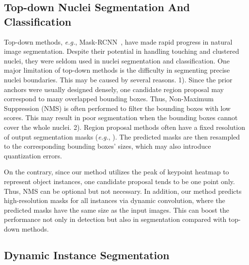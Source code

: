 \documentclass[lettersize,journal]{IEEEtran}
\newcommand{\eg}{{\textit{e.g.}}, }
\begin{document}
\subsection{Top-down Nuclei Segmentation And Classification}
Top-down methods, \eg Mask-RCNN~\cite{maskrcnn}, have made rapid progress in natural image segmentation. Despite their potential in handling touching and clustered nuclei, they were seldom used in nuclei segmentation and classification. One major limitation of top-down  methods is the difficulty in segmenting precise nuclei boundaries. This may be caused by several reasons. 1). Since the prior anchors were usually designed  densely, one candidate region proposal may correspond to many overlapped bounding boxes. Thus, Non-Maximum Suppression (NMS) is often performed to filter the bounding boxes with low scores. This may result in poor segmentation when the bounding boxes cannot cover the whole nuclei. 2). Region proposal methods often have a fixed resolution of output segmentation masks (\eg ). The predicted masks are then resampled to the corresponding bounding boxes' sizes, which may also introduce quantization errors.

On the contrary, since our method utilizes the peak of keypoint heatmap to represent object instances, one candidate proposal tends to be one point only. Thus, NMS can be optional but not necessary. In addition, our method predicts high-resolution masks for all instances via dynamic convolution, where the predicted masks have the same size as the input images. This can boost the performance not only in detection but also in segmentation compared with top-down methods.


\subsection{Dynamic Instance Segmentation}
\end{document}
